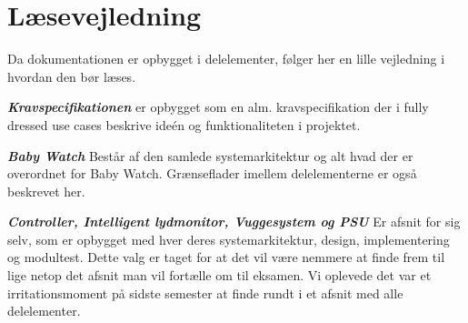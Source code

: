 \chapter{Læsevejledning}

Da dokumentationen er opbygget i delelementer, følger her en lille vejledning i hvordan den bør læses.

\textbf{\textit{Kravspecifikationen}} er opbygget som en alm. kravspecifikation der i fully dressed use cases beskrive ideén og funktionaliteten i projektet.

\textbf{\textit{Baby Watch}} Består af den samlede systemarkitektur og alt hvad der er overordnet for Baby Watch. Grænseflader imellem delelementerne er også beskrevet her.

\textbf{\textit{Controller, Intelligent lydmonitor, Vuggesystem og PSU}} Er afsnit for sig selv, som er opbygget med hver deres systemarkitektur, design, implementering og modultest. Dette valg er taget for at det vil være nemmere at finde frem til lige netop det afsnit man vil fortælle om til eksamen. Vi oplevede det var et irritationsmoment på sidste semester at finde rundt i et afsnit med alle delelementer.